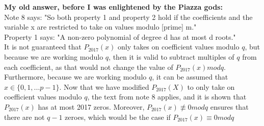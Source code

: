 \documentclass[11pt]{article}
\newenvironment{Parts}{\begin{enumerate}[label=(\alph*)]}{\end{enumerate}}
\begin{document}
\begin{Parts}
\begin{mdframed}
\textbf{My old answer, before I was enlightened by the Piazza gods:} \\
Note 8 says: "So both property 1 and property 2 hold if the coefficients and the variable x are restricted to take on values modulo [prime] m." \\
Property 1 says: "A non-zero polynomial of degree d has at most d roots." \\
It is not guaranteed that $P_{2017}(x)$ only takes on coefficient values modulo $q$, but because we are working modulo $q$, then it is valid to subtract multiples of $q$ from each coefficient, as that would not change the value of $P_{2017}(x)modq$. Furthermore, because we are working modulo $q$, it can be assumed that $x \in \{0,1,...p-1\}$. Now that we have modified $P_{2017}(X)$ to only take on coefficient values modulo $q$, the text from note 8 applies, and it is shown that $P_{2017}(x)$ has at most 2017 zeros. Moreover, $P_{2017}(x) \not \equiv 0modq$ ensures that there are not $q-1$ zeroes, which would be the case if $P_{2017}(x) \equiv 0modq$ 
\end{mdframed}
  \end{Parts}

\end{document}
